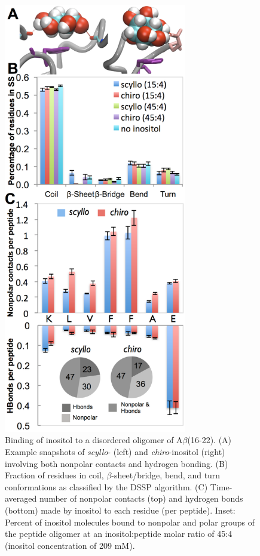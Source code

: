 \begin{figure}
\centering
\includegraphics[width=7.96cm]{figures/results2/inos2_figures_disordered_revised.pdf}
\caption[Binding of inositol to a disordered oligomer of A$\beta$(16-22)]{Binding of inositol to a disordered oligomer of A$\beta$(16-22).  (A) Example snapshots of \emph{scyllo}- (left) and \emph{chiro}-inositol (right) involving both nonpolar contacts and hydrogen bonding. (B) Fraction of residues in coil, $\beta$-sheet/bridge, bend, and turn conformations as classified by the DSSP algorithm. (C) Time-averaged number of nonpolar contacts (top) and hydrogen bonds (bottom) made by inositol to each residue (per peptide). Inset: Percent of inositol molecules bound to nonpolar and polar groups of the peptide oligomer at an inositol:peptide molar ratio of 45:4 (inositol concentration of 209 mM).}
\label{fig:disordered}
\end{figure}

